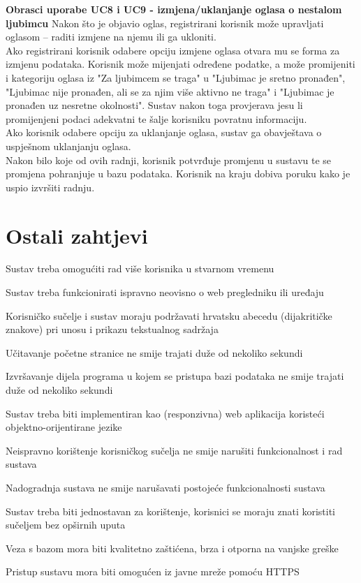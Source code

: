 			\noindent\textbf{Obrasci uporabe UC8 i UC9 - izmjena/uklanjanje oglasa o nestalom ljubimcu}\newline
			\noindent Nakon što je objavio oglas, registrirani korisnik može upravljati oglasom – raditi izmjene na njemu ili ga ukloniti. \\
Ako registrirani korisnik odabere opciju izmjene oglasa otvara mu se forma za izmjenu podataka. Korisnik može mijenjati određene podatke, a može promijeniti i kategoriju oglasa iz "Za ljubimcem se traga" u "Ljubimac je sretno pronađen", "Ljubimac nije pronađen, ali se za njim više aktivno ne traga" i "Ljubimac je pronađen uz nesretne okolnosti". Sustav nakon toga provjerava jesu li promijenjeni podaci adekvatni te šalje korisniku povratnu informaciju. \\

Ako korisnik odabere opciju za uklanjanje oglasa, sustav ga obavještava o uspješnom uklanjanju oglasa.\\
Nakon bilo koje od ovih radnji, korisnik potvrđuje promjenu u sustavu te se promjena pohranjuje u bazu podataka. Korisnik na kraju dobiva poruku kako je uspio izvršiti radnju.

	
		\section{Ostali zahtjevi}
		 
			 \begin{packed_item}
			 
			 \item Sustav treba omogućiti rad više korisnika u stvarnom vremenu
			 \item Sustav treba funkcionirati ispravno neovisno o web pregledniku ili uređaju
			 \item Korisničko sučelje i sustav moraju podržavati hrvatsku abecedu (dijakritičke znakove) pri unosu i prikazu tekstualnog sadržaja
			 \item Učitavanje početne stranice ne smije trajati duže od nekoliko sekundi
			 \item Izvršavanje dijela programa u kojem se pristupa bazi podataka ne smije trajati duže od nekoliko sekundi
			 \item Sustav treba biti implementiran kao (responzivna) web aplikacija koristeći objektno-orijentirane jezike
			 \item Neispravno korištenje korisničkog sučelja ne smije narušiti funkcionalnost i rad sustava
			 \item Nadogradnja sustava ne smije narušavati postojeće funkcionalnosti sustava
			 \item Sustav treba biti jednostavan za korištenje, korisnici se moraju znati koristiti sučeljem bez opširnih uputa
			 \item Veza s bazom mora biti kvalitetno zaštićena, brza i otporna na vanjske greške
			 \item Pristup sustavu mora biti omogućen iz javne mreže pomoću HTTPS
			 
			 
			 \end{packed_item}
			 
			 
			 
	